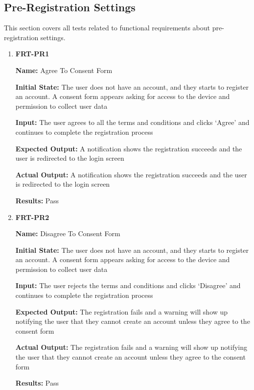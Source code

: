 \documentclass[12pt, titlepage]{article}
\begin{document}
\subsection{Pre-Registration Settings}
This section covers all tests related to functional requirements about pre-registration settings.
\begin{enumerate}
\item \textbf{FRT-PR1}

\textbf{Name:} Agree To Consent Form

\textbf{Initial State:} The user does not have an account, and they starts to register an account. A consent form appears asking for access to the device and permission to collect user data

\textbf{Input:} The user agrees to all the terms and conditions and clicks `Agree' and continues to complete the registration process
					
\textbf{Expected Output:} A notification shows the registration succeeds and the user is redirected to the login screen

\textbf{Actual Output:} A notification shows the registration succeeds and the user is redirected to the login screen

\textbf{Results:} Pass

\item \textbf{FRT-PR2}

\textbf{Name:} Disagree To Consent Form

\textbf{Initial State:} The user does not have an account, and they starts to register an account. A consent form appears asking for access to the device and permission to collect user data
					
\textbf{Input:} The user rejects the terms and conditions and clicks `Disagree' and continues to complete the registration process
					
\textbf{Expected Output:} The registration fails and a warning will show up notifying the user that they cannot create an account unless they agree to the consent form

\textbf{Actual Output:} The registration fails and a warning will show up notifying the user that they cannot create an account unless they agree to the consent form

\textbf{Results:} Pass
\end{enumerate}
\end{document}
